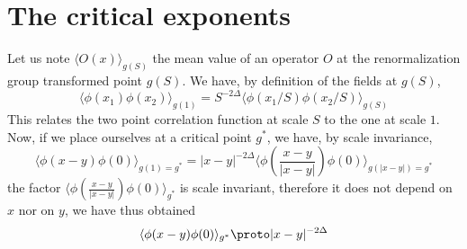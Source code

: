 \chapter{The critical exponents}

Let us note $\langle O(x) \rangle_{g(S)}$ the mean value of an operator $O$ at the renormalization group transformed point $g(S)$.
We have, by definition of the fields at $g(S)$,
\begin{equation}
\langle \phi(x_1) \phi(x_2) \rangle_{g(1)} = S^{-2 \Delta} \langle \phi(x_1/S) \phi(x_2/S) \rangle_{g(S)}
\end{equation}
This relates the two point correlation function at scale $S$ to the one at scale $1$. Now, if we place ourselves at a critical point $g^*$, we have, by scale invariance,
\begin{equation}
\langle \phi(x-y) \phi(0) \rangle_{g(1) = g^*} =|x-y|^{-2 \Delta} \langle \phi\left(\frac{x-y}{|x-y|}\right) \phi(0) \rangle_{g(|x-y|) = g^*}
\end{equation}
the factor $\langle \phi\left(\frac{x-y}{|x-y|}\right) \phi(0) \rangle_{g^*}$ is scale invariant, therefore it does not depend on $x$ nor on $y$, we have thus obtained
\begin{equation}
\langle \phi(x-y) \phi(0) \rangle_{g^*} \proto |x-y|^{-2 \Delta}
\end{equation}